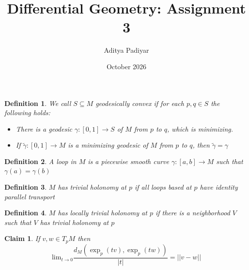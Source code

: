 \documentclass[a4paper,11pt]{article}
\title{Differential Geometry: Assignment 3}
\author{Aditya Padiyar}
\date{October 2026}
\newtheorem{claim}{Claim}
\newtheorem{definition}{Definition}
\begin{document}
\maketitle

\begin{definition}
  We call $S \subseteq M$ geodesically convex if for each $p,q \in S$ the following holds:
  \begin{itemize}
    \item There is a geodesic $\gamma:[0,1] \to S$ of $M$ from $p$ to $q$, which is minimizing.
    \item If $\widetilde{\gamma}:[0,1] \to M$ is a minimizing geodesic of $M$ from $p$ to $q$, then $\widetilde{\gamma}=\gamma$
  \end{itemize}
\end{definition}

\begin{definition}
  A loop in $M$ is a piecewise smooth curve $\gamma:[a,b] \to M$ such that $\gamma(a)=\gamma(b)$
\end{definition}

\begin{definition}
  $M$ has trivial holonomy at $p$ if all loops based at $p$ have identity parallel transport
\end{definition}

\begin{definition}
  $M$ has locally trivial holonomy at $p$ if there is a neighborhood $V$ such that $V$ has trivial holonomy at $p$
\end{definition}

\begin{claim}
  If $v,w \in T_pM$ then \[\text{lim}_{t \to 0}\frac{d_M(\exp_p(tv),\exp_p(tw))}{|t|}=||v-w||\]
\end{claim}
\end{document}
